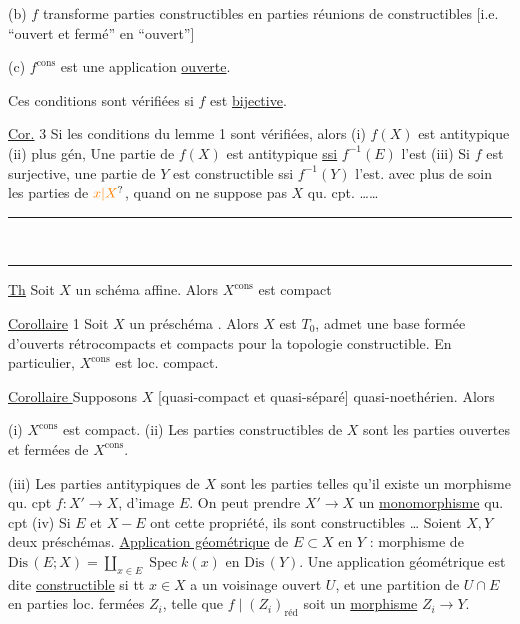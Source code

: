 (b) $f$ transforme parties constructibles en parties réunions de constructibles [i.e. ``ouvert et fermé'' en ``ouvert'']

(c) $f^{\mathrm{cons}}$ est une application \uline{ouverte}.  

Ces conditions sont vérifiées si $f$ est \uline{bijective}.

\uline{Cor.} 3 Si les conditions du lemme 1 sont vérifiées, alors (i) $f(X)$ est antitypique (ii) plus gén, Une partie  de $f(X)$ est antitypique \uline{ssi} $f^{-1}(E)$ l'est (iii) Si $f$ est surjective, une partie de $Y$ est constructible ssi $f^{-1}(Y)$ l'est.
 avec plus de soin les parties   de $\unsure{x|X}$, quand on ne suppose pas $X$ qu. cpt. \ldots\ldots

\begin{center}\rule{1.3cm}{0.4pt}\\[-3pt]\rule{.85cm}{0.4pt}\end{center}

\uline{Th} Soit $X$ un schéma affine. Alors $X^{\mathrm{cons}}$ est compact

\uline{Corollaire} 1 Soit $X$ un préschéma .  Alors $X$ est $T_0$, admet une base formée d'ouverts rétrocompacts et compacts pour la topologie constructible. En particulier, $X^{\mathrm{cons}}$ est loc. compact.

\uline{Corollaire } Supposons  $X$ [quasi-compact et quasi-séparé]  quasi-noethérien. Alors

(i) $X^{\mathrm{cons}}$ est compact. (ii) Les parties constructibles de $X$ sont les parties ouvertes et fermées de $X^{\mathrm{cons}}$.

(iii) Les parties  antitypiques de $X$ sont les parties  telles qu'il existe un morphisme qu. cpt $f:X'\to X$, d'image $E$. On peut prendre   $X'\to X$ un \uline{monomorphisme} \deleted{[\unsure{N.B. ce sont}} qu. cpt  (iv) Si $E$ et $X-E$ ont cette propriété, ils sont constructibles \ldots
Soient $X,Y$ deux préschémas. \uline{Application géométrique} de $E\subset X$ en $Y$ : morphisme de $\mathrm{Dis}\,(E;X)=\coprod_{x\in E}\operatorname{Spec}k(x)$ en $\mathrm{Dis}\,(Y)$.  Une application géométrique est dite \uline{constructible} si tt $x\in X$ a un voisinage ouvert  $U$, et une partition de $U\cap E$ en parties loc. fermées $Z_i$, telle que $f\mid(Z_i)_{\mathrm{réd}}$ soit un \uline{morphisme} $Z_i\longrightarrow Y$. 

